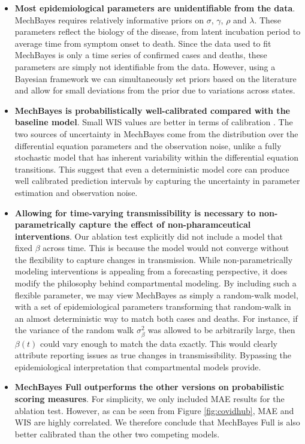 \documentclass[11pt]{amsart}
\begin{document}
\begin{itemize}
\item \textbf{Most epidemiological parameters are unidentifiable from the data}. MechBayes requires relatively informative priors on $\sigma$, $\gamma$, $\rho$ and $\lambda$. These parameters reflect the biology of the disease, from latent incubation period to average time from symptom onset to death. Since the data used to fit MechBayes is only a time series of confirmed cases and deaths, these parameters are simply not identifiable from the data. However, using a Bayesian framework we can simultaneously set priors based on the literature and allow for small deviations from the prior due to variations across states. 

\item \textbf{MechBayes is probabilistically well-calibrated compared with the baseline model}. Small WIS values are better in terms of calibration \cite{bracher2020evaluating}. The two sources of uncertainty in MechBayes come from the distribution over the differential equation parameters and the observation noise, unlike a fully stochastic model that has inherent variability within the differential equation transitions. This suggest that even a deterministic model core can produce well calibrated prediction intervals by capturing the uncertainty in parameter estimation and observation noise. 





\item \textbf{Allowing for time-varying transmissibility is necessary to non-parametrically capture the effect of non-pharamceutical interventions}. Our ablation test explicitly did not include a model that fixed $\beta$ across time. This is because the model would not converge without the flexibility to capture changes in transmission. While non-parametrically modeling interventions is appealing from a forecasting perspective, it does modify the philosophy behind compartmental modeling. By including such a flexible parameter, we may view MechBayes as simply a random-walk model, with a set of epidemiological parameters transforming that random-walk in an almost deterministic way to match both cases and deaths. For instance, if the variance of the random walk $\sigma_{\beta}^2$ was allowed to be arbitrarily large, then $\beta(t)$ could vary enough to match the data exactly. This would clearly attribute reporting issues as true changes in transmissibility. Bypassing the epidemiological interpretation that compartmental models provide. 


\item \textbf{MechBayes Full outperforms the other versions on probabilistic scoring measures}. For simplicity, we only included MAE results for the ablation test. However, as can be seen from Figure \ref{fig:covidhub}, MAE and WIS are highly correlated. We therefore conclude that MechBayes Full is also better calibrated than the other two competing models. 
\end{itemize}
\end{document}
